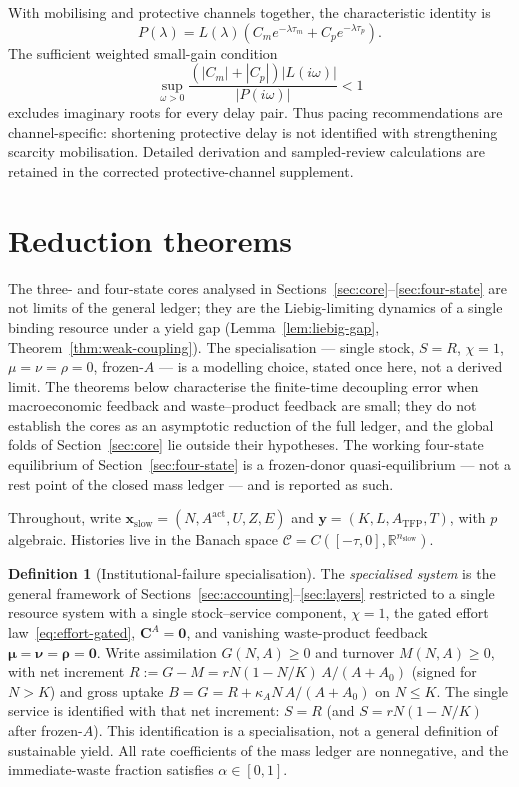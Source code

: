 \documentclass[11pt]{article}
\theoremstyle{definition}
\newtheorem{definition}{Definition}
\begin{document}
With mobilising and protective channels together, the characteristic identity is
\[
P(\lambda)
=L(\lambda)\left(C_m e^{-\lambda\tau_m}+C_p e^{-\lambda\tau_p}\right).
\]
The sufficient weighted small-gain condition
\[
\sup_{\omega>0}
\frac{(|C_m|+|C_p|)|L(i\omega)|}{|P(i\omega)|}<1
\]
excludes imaginary roots for every delay pair. Thus pacing recommendations are channel-specific: shortening protective delay is not identified with strengthening scarcity mobilisation. Detailed derivation and sampled-review calculations are retained in the corrected protective-channel supplement.

\section{Reduction theorems}
\label{sec:reduction-theorems}

The three- and four-state cores analysed in Sections~\ref{sec:core}--\ref{sec:four-state} are not limits of the general ledger; they are the Liebig-limiting dynamics of a single binding resource under a yield gap (Lemma~\ref{lem:liebig-gap}, Theorem~\ref{thm:weak-coupling}). The specialisation --- single stock, $S=R$, $\chi=1$, $\mu=\nu=\rho=0$, frozen-$A$ --- is a modelling choice, stated once here, not a derived limit. The theorems below characterise the finite-time decoupling error when macroeconomic feedback and waste--product feedback are small; they do not establish the cores as an asymptotic reduction of the full ledger, and the global folds of Section~\ref{sec:core} lie outside their hypotheses. The working four-state equilibrium of Section~\ref{sec:four-state} is a frozen-donor quasi-equilibrium --- not a rest point of the closed mass ledger --- and is reported as such.

Throughout, write $\mathbf x_{\mathrm{slow}}=(N,A^{\mathrm{act}},U,Z,E)$ and $\mathbf y=(K,L,A_{\mathrm{TFP}},T)$, with $p$ algebraic. Histories live in the Banach space $\mathcal C=C([-\tau,0],\mathbb R^{n_{\mathrm{slow}}})$.

\begin{definition}[Institutional-failure specialisation]
\label{def:specialisation}
The \emph{specialised system} is the general framework of Sections~\ref{sec:accounting}--\ref{sec:layers} restricted to a single resource system with a single stock--service component, $\chi=1$, the gated effort law~\eqref{eq:effort-gated}, $\mathbf C^A=\mathbf 0$, and vanishing waste-product feedback $\boldsymbol\mu=\boldsymbol\nu=\boldsymbol\rho=\mathbf 0$. Write assimilation $G(N,A)\ge 0$ and turnover $M(N,A)\ge 0$, with net increment $R:=G-M=rN(1-N/K)\,A/(A+A_0)$ (signed for $N>K$) and gross uptake $B=G=R+\kappa_A N\,A/(A+A_0)$ on $N\le K$. The single service is identified with that net increment: $S=R$ (and $S=rN(1-N/K)$ after frozen-$A$). This identification is a specialisation, not a general definition of sustainable yield. All rate coefficients of the mass ledger are nonnegative, and the immediate-waste fraction satisfies $\alpha\in[0,1]$.
\end{definition}
\end{document}
